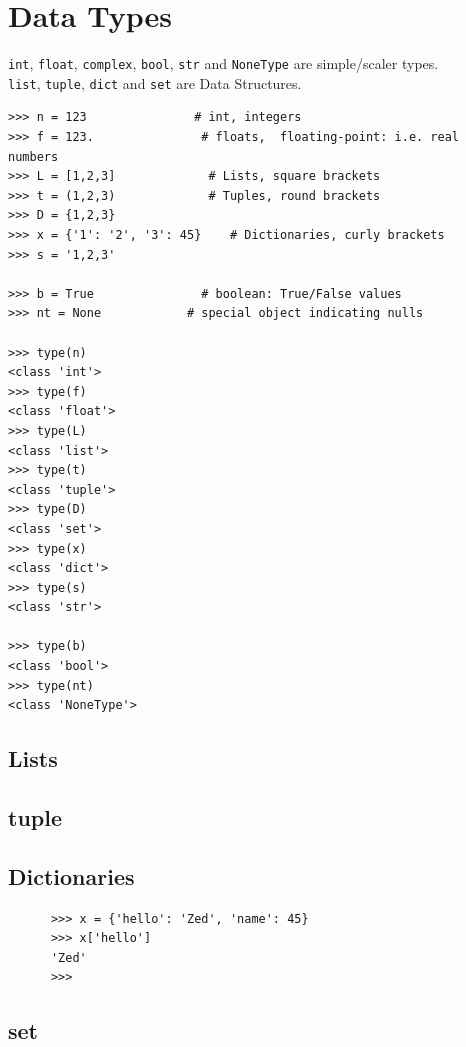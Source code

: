 \documentclass[11pt,a4paper]{article}
\begin{document}
\newpage
\section{Data Types}
{\tt int}, {\tt float}, {\tt complex}, {\tt bool}, {\tt str} and {\tt NoneType} are simple/scaler types. \\
{\tt list}, {\tt tuple}, {\tt dict} and {\tt set} are Data Structures. \\

\begin{lstlisting}
>>> n = 123               # int, integers
>>> f = 123.               # floats,  floating-point: i.e. real numbers
>>> L = [1,2,3]             # Lists, square brackets
>>> t = (1,2,3)             # Tuples, round brackets
>>> D = {1,2,3}               
>>> x = {'1': '2', '3': 45}    # Dictionaries, curly brackets
>>> s = '1,2,3'

>>> b = True               # boolean: True/False values
>>> nt = None            # special object indicating nulls

>>> type(n)
<class 'int'>
>>> type(f)
<class 'float'>
>>> type(L)
<class 'list'>
>>> type(t)
<class 'tuple'>
>>> type(D)
<class 'set'>
>>> type(x)
<class 'dict'>
>>> type(s)
<class 'str'>

>>> type(b)
<class 'bool'>
>>> type(nt)
<class 'NoneType'>
\end{lstlisting}


    \subsection{Lists}

    \subsection{tuple}
    
    \subsection{Dictionaries}
    \begin{lstlisting}
      >>> x = {'hello': 'Zed', 'name': 45}
      >>> x['hello']
      'Zed'
      >>> 
    \end{lstlisting}
    
    \subsection{set}
\end{document}
